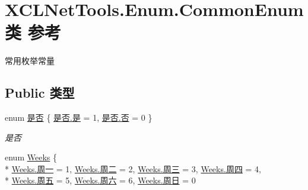 \hypertarget{class_x_c_l_net_tools_1_1_enum_1_1_common_enum}{}\section{X\+C\+L\+Net\+Tools.\+Enum.\+Common\+Enum类 参考}
\label{class_x_c_l_net_tools_1_1_enum_1_1_common_enum}


常用枚举常量  


\subsection*{Public 类型}
\begin{DoxyCompactItemize}
\item 
enum \hyperlink{class_x_c_l_net_tools_1_1_enum_1_1_common_enum_a5940e298dc09411c8a238f4f4e94e633}{是否} \{ \hyperlink{class_x_c_l_net_tools_1_1_enum_1_1_common_enum_a5940e298dc09411c8a238f4f4e94e633a0a60ac8f02ccd2cf723f927284877851}{是否.\+是} = 1, 
\hyperlink{class_x_c_l_net_tools_1_1_enum_1_1_common_enum_a5940e298dc09411c8a238f4f4e94e633ac9744f45e76d885ae1c74d4f4a934b2e}{是否.\+否} = 0
 \}\begin{DoxyCompactList}\small\item\em 是否 \end{DoxyCompactList}
\item 
enum \hyperlink{class_x_c_l_net_tools_1_1_enum_1_1_common_enum_adeccaeb33560c30593da561d8d0fe8de}{Weeks} \{ \\*
\hyperlink{class_x_c_l_net_tools_1_1_enum_1_1_common_enum_adeccaeb33560c30593da561d8d0fe8dea1603b069c2acf27a87ce160aa3b01336}{Weeks.\+周一} = 1, 
\hyperlink{class_x_c_l_net_tools_1_1_enum_1_1_common_enum_adeccaeb33560c30593da561d8d0fe8deab5a6a07e48ecd1e7be525c75c7adc56b}{Weeks.\+周二} = 2, 
\hyperlink{class_x_c_l_net_tools_1_1_enum_1_1_common_enum_adeccaeb33560c30593da561d8d0fe8deae60725e762551a706d64f9c9ec55aef2}{Weeks.\+周三} = 3, 
\hyperlink{class_x_c_l_net_tools_1_1_enum_1_1_common_enum_adeccaeb33560c30593da561d8d0fe8dea170fc8e27c08f11a440bfb1cbd6cc6fd}{Weeks.\+周四} = 4, 
\\*
\hyperlink{class_x_c_l_net_tools_1_1_enum_1_1_common_enum_adeccaeb33560c30593da561d8d0fe8deaeb79cea638b82f33d30ed5600f040d4b}{Weeks.\+周五} = 5, 
\hyperlink{class_x_c_l_net_tools_1_1_enum_1_1_common_enum_adeccaeb33560c30593da561d8d0fe8dea2457513054904ecee1cf282304c39e32}{Weeks.\+周六} = 6, 
\hyperlink{class_x_c_l_net_tools_1_1_enum_1_1_common_enum_adeccaeb33560c30593da561d8d0fe8dea562d7476abdbf97e2d5bdb25cd2b9ceb}{Weeks.\+周日} = 0

\end{DoxyCompactItemize}
